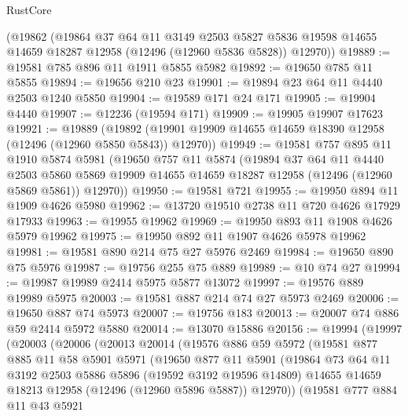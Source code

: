 \begin{lexlean}{RustCore}
\begin{coremodule}
    (@19862
      (@19864
        @37
        @64
        @11
        @3149
        @2503
        @5827
        @5836
        @19598
        @14655
        @14659
        @18287
        @12958
        (@12496 (@12960 @5836 @5828))
        @12970))
@19889 := @19581 @785 @896 @11 @1911 @5855 @5982
@19892 := @19650 @785 @11 @5855
@19894 := @19656 @210 @23
@19901 := @19894 @23 @64 @11 @4440 @2503 @1240 @5850
@19904 := @19589 @171 @24 @171
@19905 := @19904 @4440
@19907 := @12236 (@19594 @171)
@19909 := @19905 @19907 @17623
@19921 := @19889
    (@19892 (@19901 @19909 @14655 @14659 @18390 @12958 (@12496 (@12960 @5850 @5843)) @12970))
@19949 := @19581
    @757
    @895
    @11
    @1910
    @5874
    @5981
    (@19650
      @757
      @11
      @5874
      (@19894
        @37
        @64
        @11
        @4440
        @2503
        @5860
        @5869
        @19909
        @14655
        @14659
        @18287
        @12958
        (@12496 (@12960 @5869 @5861))
        @12970))
@19950 := @19581 @721
@19955 := @19950 @894 @11 @1909 @4626 @5980
@19962 := @13720 @19510 @2738 @11 @720 @4626 @17929 @17933
@19963 := @19955 @19962
@19969 := @19950 @893 @11 @1908 @4626 @5979 @19962
@19975 := @19950 @892 @11 @1907 @4626 @5978 @19962
@19981 := @19581 @890 @214 @75 @27 @5976 @2469
@19984 := @19650 @890 @75 @5976
@19987 := @19756 @255 @75 @889
@19989 := @10 @74 @27
@19994 := @19987 @19989 @2414 @5975 @5877 @13072
@19997 := @19576 @889 @19989 @5975
@20003 := @19581 @887 @214 @74 @27 @5973 @2469
@20006 := @19650 @887 @74 @5973
@20007 := @19756 @183
@20013 := @20007 @74 @886 @59 @2414 @5972 @5880
@20014 := @13070 @15886
@20156 := @19994
    (@19997
      (@20003
        (@20006
          (@20013
            @20014
            (@19576
              @886
              @59
              @5972
              (@19581
                @877
                @885
                @11
                @58
                @5901
                @5971
                (@19650
                  @877
                  @11
                  @5901
                  (@19864
                    @73
                    @64
                    @11
                    @3192
                    @2503
                    @5886
                    @5896
                    (@19592 @3192 @19596 @14809)
                    @14655
                    @14659
                    @18213
                    @12958
                    (@12496 (@12960 @5896 @5887))
                    @12970))
                (@19581
                  @777
                  @884
                  @11
                  @43
                  @5921

\end{coremodule}
\end{lexlean}
